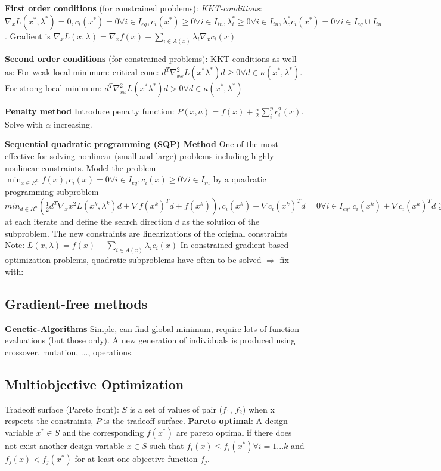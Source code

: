 \textbf{First order conditions} (for constrained problems): \textit{KKT-conditions}: $\nabla_x L(x^*, \lambda^*) = 0, c_i(x^*) = 0 \forall i \in I_{eq}, c_i (x^*) \geq 0 \forall i \in I_{in}, \lambda_i^* \geq 0 \forall i \in I_{in}, \lambda_o^* c_i (x^*) = 0 \forall i \in I_{eq} \cup I_{in}$. Gradient is $\nabla_x L (x, \lambda) = \nabla_x f(x) - \sum_{i\in A(x)} \lambda_i \nabla_x c_i (x)$

\textbf{Second order conditions} (for constrained problems): KKT-conditions as well as:
For weak local minimum: critical cone: $d^T \nabla_{xx}^2 L(x^* \lambda^*)d \geq 0 \forall d \in \kappa(x^*, \lambda^*)$.  
For strong local minimum: $d^T \nabla_{xx}^2 L(x^* \lambda^*)d > 0 \forall d \in \kappa(x^*, \lambda^*)$

\textbf{Penalty method}
Introduce penalty function: $P(x,a) = f(x) + \frac{\alpha}{2} \sum_i^p c_i^2 (x)$. Solve with $\alpha$ increasing.

\textbf{Sequential quadratic programming (SQP) Method}
One of the most effective for solving nonlinear (small and large) problems including highly nonlinear constraints.
Model the problem $\min_{x\in R^n} f(x), c_i (x) = 0 \forall i \in I_{eq}, c_i (x) \geq 0 \forall i \in I_{in}$ by a quadratic programming subproblem $min_{d \in R^n} (\frac{1}{2} d^T \nabla_xx^2 L (x^k, \lambda^k) d + \nabla f (x^k)^T d + f(x^k)), c_i (x^k) + \nabla c_i (x^k)^T d = 0 \forall i \in I_{eq}, c_i (x^k) + \nabla c_i (x^k)^T d \geq 0 \forall i \in I_{in}$ at each iterate and define the search direction $d$ as the solution of the subproblem.
The new constraints are linearizations of the original constraints
Note: $L(x,\lambda) = f(x) - \sum_{i\in A(x)}\lambda_i c_i (x)$
In constrained gradient based optimization problems, quadratic subproblems have often to be solved $\Rightarrow$ fix with:

\subsection*{Gradient-free methods}
\textbf{Genetic-Algorithms}
Simple, can find global minimum, require lots of function evaluations (but those only). A new generation of individuals is produced using crossover, mutation, ..., operations.

\subsection*{Multiobjective Optimization}
Tradeoff surface (Pareto front): $S$ is a set of values of pair ($f_1$, $f_2$) when x respects the constraints, $P$ is the tradeoff surface.
\textbf{Pareto optimal}: A design variable $x^* \in S$ and the corresponding $f(x^*)$ are pareto optimal if there does not exist another design variable $x\in S$ such that $f_i (x) \leq f_i (x^*) \forall i = 1 ... k$ and $f_j (x) < f_j (x^*)$ for at least one objective function $f_j$.


